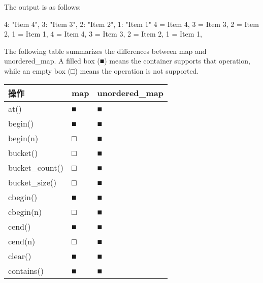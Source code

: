 The output is as follows:

\begin{shell}
{4: "Item 4", 3: "Item 3", 2: "Item 2", 1: "Item 1"}
4 = Item 4, 3 = Item 3, 2 = Item 2, 1 = Item 1,
4 = Item 4, 3 = Item 3, 2 = Item 2, 1 = Item 1,
\end{shell}

The following table summarizes the differences between map and unordered\_map. A filled box (■) means the container supports that operation, while an empty box (□) means the operation is not supported.

\begin{longtable}{|l|l|l|}
\hline
\textbf{操作}                           & \textbf{map} & \textbf{unordered\_map} \\ \hline
\endfirsthead
%
\endhead
%
at()                                         & ■            & ■                       \\ \hline
begin()                                      & ■            & ■                       \\ \hline
begin(n)                                     & □            & ■                       \\ \hline
bucket()                                     & □            & ■                       \\ \hline
bucket\_count()                              & □            & ■                       \\ \hline
bucket\_size()                               & □            & ■                       \\ \hline
cbegin()                                     & ■            & ■                       \\ \hline
cbegin(n)                                    & □            & ■                       \\ \hline
cend()                                       & ■            & ■                       \\ \hline
cend(n)                                      & □            & ■                       \\ \hline
clear()                                      & ■            & ■                       \\ \hline
contains()                                   & ■            & ■                       \\ \hline

\end{longtable}
